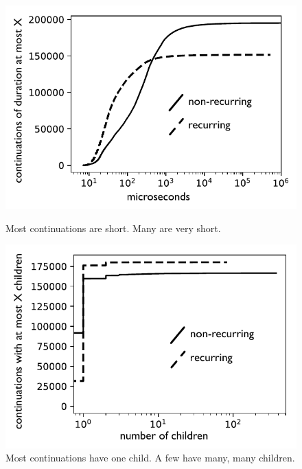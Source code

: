 \documentclass[acmsmall,anonymous,review]{acmart}\settopmatter{printfolios=true,printccs=false,printacmref=false}
\begin{document}

\begin{figure}
    \centering
    \begin{minipage}[t]{0.47\textwidth}
        \centering
        \includegraphics[width=1.0\textwidth]{Graphs/durations_bw}
        \caption{Most continuations are short.
  Many are very short.}
        \label{fig:graph_duration}
    \end{minipage}\hfill
    \begin{minipage}[t]{0.47\textwidth}
        \centering
        \includegraphics[width=1.0\textwidth]{Graphs/branching_bw}
        \caption{Most continuations have one child.
A few have many, many children.}
        \label{fig:graph_branching}
    \end{minipage}
\end{figure}
\end{document}
